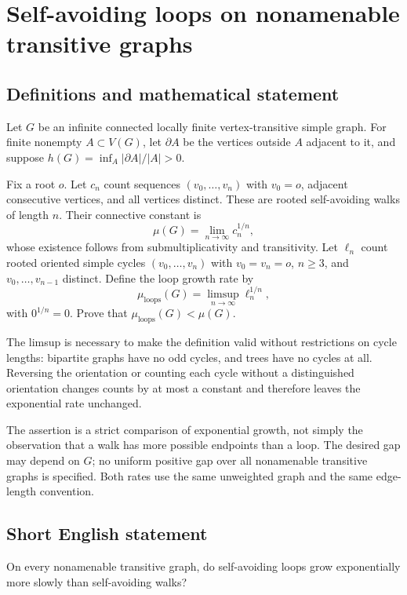 \documentclass[11pt,a4paper]{article}
\begin{document}
\section*{Self-avoiding loops on nonamenable transitive graphs}\label{statement}

\subsection{Definitions and mathematical statement}
Let $G$ be an infinite connected locally finite vertex-transitive simple graph. For finite nonempty $A\subset V(G)$, let $\partial A$ be the vertices outside $A$ adjacent to it, and suppose $h(G)=\inf_A|\partial A|/|A|>0$.

Fix a root $o$. Let $c_n$ count sequences $(v_0,\ldots,v_n)$ with $v_0=o$, adjacent consecutive vertices, and all vertices distinct. These are rooted self-avoiding walks of length $n$. Their connective constant is
\[
\mu(G)=\lim_{n\to\infty}c_n^{1/n},
\]
whose existence follows from submultiplicativity and transitivity. Let $\ell_n$ count rooted oriented simple cycles $(v_0,\ldots,v_n)$ with $v_0=v_n=o$, $n\ge3$, and $v_0,\ldots,v_{n-1}$ distinct. Define the loop growth rate by
\[
\mu_{\mathrm{loops}}(G)=\limsup_{n\to\infty}\ell_n^{1/n},
\]
with $0^{1/n}=0$. Prove that $\mu_{\mathrm{loops}}(G)<\mu(G)$.

The limsup is necessary to make the definition valid without restrictions on cycle lengths: bipartite graphs have no odd cycles, and trees have no cycles at all. Reversing the orientation or counting each cycle without a distinguished orientation changes counts by at most a constant and therefore leaves the exponential rate unchanged.

The assertion is a strict comparison of exponential growth, not simply the observation that a walk has more possible endpoints than a loop. The desired gap may depend on $G$; no uniform positive gap over all nonamenable transitive graphs is specified. Both rates use the same unweighted graph and the same edge-length convention.
\subsection{Short English statement}
On every nonamenable transitive graph, do self-avoiding loops grow exponentially more slowly than self-avoiding walks?
\end{document}
